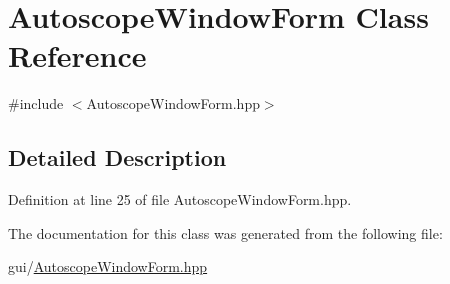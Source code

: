 \hypertarget{class_autoscope_window_form}{}\section{Autoscope\+Window\+Form Class Reference}
\label{class_autoscope_window_form}


{\ttfamily \#include $<$Autoscope\+Window\+Form.\+hpp$>$}



\subsection{Detailed Description}


Definition at line 25 of file Autoscope\+Window\+Form.\+hpp.



The documentation for this class was generated from the following file\+:\begin{DoxyCompactItemize}
\item 
gui/\mbox{\hyperlink{_autoscope_window_form_8hpp}{Autoscope\+Window\+Form.\+hpp}}\end{DoxyCompactItemize}
